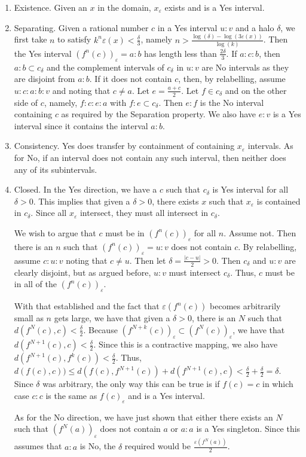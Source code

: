 \documentclass[12pt]{article}
\begin{document}
\begin{enumerate}
    \item Existence. Given an $x$ in the domain, $x_\varepsilon$ exists and is a Yes interval. 
    \item Separating. Given a rational number $c$ in a Yes interval $u:v$ and a halo $\delta$, we first take $n$ to satisfy $k^n \varepsilon(x) < \frac{\delta}{3}$, namely $n > \frac{\log(\delta) - \log(3\varepsilon(x))}{\log(k)}$. Then the Yes interval $(f^n (c))_\varepsilon= a:b$ has length less than $\frac{2 \delta}{3}$. If $a:c:b$, then  $a:b \subset c_\delta$ and the complement intervals of $c_\delta$ in $u:v$ are No intervals as they are disjoint from $a:b$. If it does not contain $c$, then, by relabelling, assume $u:c:a:b:v$ and noting that $c \neq a$.  Let $e = \frac{a+c}{2}$. Let $f \in c_\delta$ and on the other side of $c$, namely, $f:c:e:a$ with $f:e \subset c_\delta$. Then $e:f$ is the No interval containing $c$ as required by the Separation property. We also have $e:v$ is a Yes interval since it contains the interval $a:b$. 
    \item Consistency. Yes does transfer by containment of containing $x_\varepsilon$ intervals. As for No, if an interval does not contain any such interval, then neither does any of its subintervals. 
    \item Closed. In the Yes direction, we have a $c$ such that $c_\delta$ is Yes interval for all $\delta > 0$. This implies that given a $\delta > 0$, there exists $x$ such that $x_\varepsilon$ is contained in $c_\delta$. Since all $x_\varepsilon$ intersect, they must all intersect in $c_\delta$.  
    
    We wish to argue that $c$ must be in $(f^n(c))_\varepsilon$ for all $n$. Assume not. Then there is an $n$ such that $(f^n(c))_\varepsilon = u:v$ does not contain $c$. By relabelling, assume $c:u:v$ noting that $c \neq u$. Then let $\delta = \frac{|c-u|}{2} > 0$. Then $c_\delta$ and $u:v$ are clearly disjoint, but as argued before, $u:v$ must intersect $c_\delta$. Thus, $c$ must be in all of the $(f^n(c))_\varepsilon$.
    
    With that established and the fact that $\varepsilon(f^n(c))$ becomes arbitrarily small as $n$ gets large, we have that given a $\delta > 0$, there is an $N$ such that $d(f^N(c), c) < \frac{\delta}{2}$. Because $(f^{N+k}(c))_\varepsilon \subset (f^N(c))_\varepsilon$, we have that $d(f^{N+1}(c), c) < \frac{\delta}{2}$. Since this is a contractive mapping, we also have $d(f^{N+1}(c), f^k(c))<  \frac{\delta}{2}$. Thus, $d(f(c), c)) \leq d(f(c), f^{N+1}(c)) + d(f^{N+1}(c), c) < \frac{\delta}{2} + \frac{\delta}{2} = \delta$. Since $\delta$ was arbitrary, the only way this can be true is if $f(c) = c$ in which case $c:c$ is the same as $f(c)_\varepsilon$ and is a Yes interval. 
    
    As for the No direction, we have just shown that either there exists an $N$ such that  $(f^N(a))_\varepsilon$ does not contain $a$ or $a:a$ is a Yes singleton. Since this assumes that $a:a$ is No, the $\delta$ required would be $\frac{\varepsilon(f^N(a))}{2}$. 
\end{enumerate}
\end{document}
